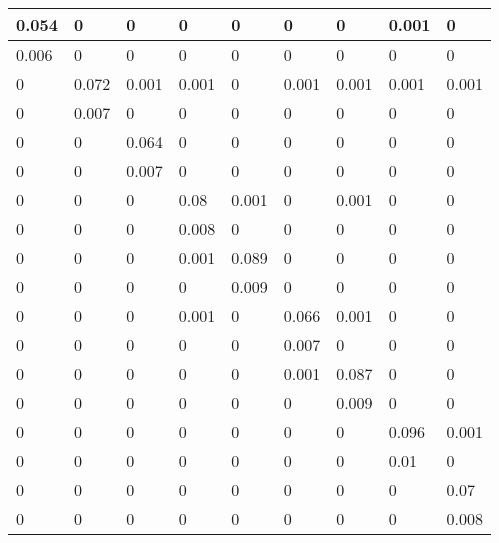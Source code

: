 \begin{tabular}{|l|l|l|l|l|l|l|l|l|}
\hline
0.054&0&0&0&0&0&0&0.001&0\\\hline
0.006&0&0&0&0&0&0&0&0\\\hline
0&0.072&0.001&0.001&0&0.001&0.001&0.001&0.001\\\hline
0&0.007&0&0&0&0&0&0&0\\\hline
0&0&0.064&0&0&0&0&0&0\\\hline
0&0&0.007&0&0&0&0&0&0\\\hline
0&0&0&0.08&0.001&0&0.001&0&0\\\hline
0&0&0&0.008&0&0&0&0&0\\\hline
0&0&0&0.001&0.089&0&0&0&0\\\hline
0&0&0&0&0.009&0&0&0&0\\\hline
0&0&0&0.001&0&0.066&0.001&0&0\\\hline
0&0&0&0&0&0.007&0&0&0\\\hline
0&0&0&0&0&0.001&0.087&0&0\\\hline
0&0&0&0&0&0&0.009&0&0\\\hline
0&0&0&0&0&0&0&0.096&0.001\\\hline
0&0&0&0&0&0&0&0.01&0\\\hline
0&0&0&0&0&0&0&0&0.07\\\hline
0&0&0&0&0&0&0&0&0.008\\\hline
\end{tabular}
